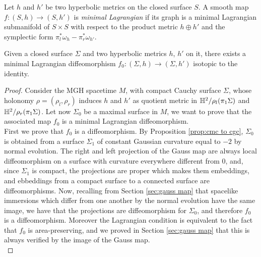 \begin{definition}
    Let $h$ and $h'$ be two hyperbolic metrics on the closed surface $S$. A smooth map $f: (S,h) \to (S,h')$ is \textit{minimal Lagrangian} if its graph is a minimal Lagrangian submanifold of $S\times S$ with respect to the product metric $h \oplus h'$ and the symplectic form $\pi_l^*\omega_h - \pi_r^* \omega_{h'}$. 
\end{definition}

\begin{theorem}\label{thm:existence}
    Given a closed surface $\Sigma$ and two hyperbolic metrics $h$, $h'$ on it, there exists a minimal Lagrangian diffeomorphism $f_0 : (\Sigma,h) \to (\Sigma,h')$ isotopic to the identity.
\end{theorem}
\begin{proof}
    Consider the MGH spacetime $M$, with compact Cauchy surface $\Sigma$, whose holonomy $\rho = (\rho_l, \rho_r)$ induces $h$ and $h'$ as quotient metric in $\mathbb{H}^2 / \rho_l(\pi_1 \Sigma)$ and $\mathbb{H}^2 / \rho_r(\pi_1 \Sigma)$. Let now $\Sigma_0$ be a maximal surface in $M$, we want to prove that the associated map $f_0$ is a minimal Lagrangian diffeomorphism.\\
    First we prove that $f_0$ is a diffeomorphism. By Proposition \ref{prop:cmc to cgc}, $\Sigma_0$ is obtained from a surface $\Sigma_1$ of constant Gaussian curvature equal to $-2$ by normal evolution. The right and left projection of the Gauss map are always local diffeomorphism on a surface with curvature everywhere different from $0$, 
    and, since $\Sigma_1$ is compact, the projections are proper which makes them embeddings, and ebbeddings from a compact surface to a connected surface are diffeomorphisms.
    Now, recalling from Section \ref{sec:gauss map} that spacelike immersions which differ from one another by the normal evolution have the same image, we have that the projections are diffeomorphism for $\Sigma_0$, and therefore $f_0$ is a diffeomorphism.
    Moreover the Lagrangian condition is equivalent to the fact that $f_0$ is area-preserving, and we proved in Section \ref{sec:gauss map} that this is always verified by the image of the Gauss map.\\

\end{proof}
